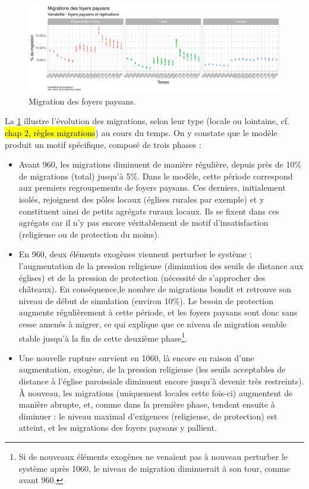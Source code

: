 \begin{figure}[H]
	\centering
	\includegraphics[width=\linewidth]{img/results_6_6/FP_TypeDeplacements_Haut.pdf}
	\caption{Migration des foyers paysans.}
	\label{fig:results-fp-migrations-base}
\end{figure}

La \cref{fig:results-fp-migrations-base} illustre l'évolution des migrations, selon leur type (locale ou lointaine, cf. \hl{chap 2, règles migrations}) au cours du temps.
On y constate que le modèle produit un motif spécifique, composé de trois phases :
\begin{itemize}
	\item Avant 960, les migrations diminuent de manière régulière, depuis près de 10\% de migrations (total) jusqu'à 5\%.
	Dans le modèle, cette période correspond aux premiers regroupements de foyers paysans.
	Ces derniers, initialement isolés, rejoignent des pôles locaux (églises rurales par exemple) et y constituent ainsi de petits agrégats ruraux locaux.
	Ils se fixent dans ces agrégats car il n'y pas encore véritablement de motif d'insatisfaction (religieuse ou de protection du moins).
	\item En 960, deux éléments exogènes viennent perturber le système : l'augmentation de la pression religieuse (diminution des seuils de distance aux églises) et de la pression de protection (nécessité de s'approcher des châteaux).
	En conséquence,le nombre de migrations bondit et retrouve son niveau de début de simulation (environ 10\%).
	Le besoin de protection augmente régulièrement à cette période, et les foyers paysans sont donc sans cesse amenés à migrer, ce qui explique que ce niveau de migration semble stable jusqu'à la fin de cette deuxième phase\footnote{
		Si de nouveaux éléments exogènes ne venaient pas à nouveau perturber le système après 1060, le niveau de migration diminuerait à son tour, comme avant 960.
	}.
	\item Une nouvelle rupture survient en 1060, là encore en raison d'une augmentation, exogène, de la pression religieuse (les seuils acceptables de distance à l'église paroissiale diminuent encore jusqu'à devenir très restreints).
	À nouveau, les migrations (uniquement locales cette fois-ci) augmentent de manière abrupte, et, comme dans la première phase, tendent ensuite à diminuer : le niveau maximal d'exigences (religieuse, de protection) est atteint, et les migrations des foyers paysans y pallient.
\end{itemize}

